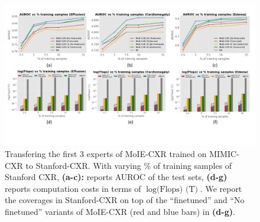 \begin{figure}[t]
\vskip 0.2in
\begin{center}
\centerline{\includegraphics[width=\linewidth]{plots/main/Domain_genelization.pdf}}
\caption{Transfering the first 3 experts of MoIE-CXR trained on MIMIC-CXR to Stanford-CXR. With varying \% of training samples of Stanford CXR, \textbf{(a-c):}  reports AUROC of the test sets, \textbf{(d-g)} reports computation costs in terms of $\log\text{(Flops) (T)}$.
We report the coverages in Stanford-CXR on top of the ``finetuned'' and ``No finetuned'' variants of MoIE-CXR (red and blue bars) in \textbf{(d-g)}.
}
\label{fig:domain_generelization}
\end{center}
\end{figure}

